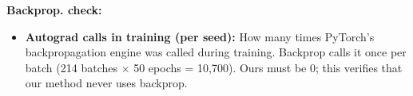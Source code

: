 \documentclass{article}
\begin{document}
{\noindent\textbf{Backprop. check:}
\begin{itemize}
  \item \textbf{Autograd calls in training (per seed):} How many times PyTorch's backpropagation engine was called during training. Backprop calls it once per batch (214 batches $\times$ 50 epochs = 10,700). Ours must be 0; this verifies that our method never uses backprop.
\end{itemize}
}
\end{document}
